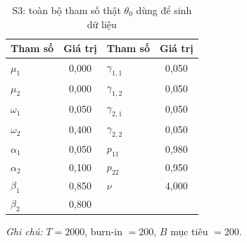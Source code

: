 \documentclass[11pt,a4paper]{article}
\begin{document}
\begin{table}[H]\centering\small
\caption{S3: toàn bộ tham số thật $\theta_0$ dùng để sinh dữ liệu}
\begin{tabularx}{\textwidth}{l C  l C}
\toprule
\textbf{Tham số} & \textbf{Giá trị} & \textbf{Tham số} & \textbf{Giá trị} \\
\midrule
$\mu_1$ & 0{,}000 & $\gamma_{1,1}$ & 0{,}050 \\
$\mu_2$ & 0{,}000 & $\gamma_{1,2}$ & 0{,}050 \\
$\omega_1$ & 0{,}050 & $\gamma_{2,1}$ & 0{,}050 \\
$\omega_2$ & 0{,}400 & $\gamma_{2,2}$ & 0{,}050 \\
$\alpha_1$ & 0{,}050 & $p_{11}$ & 0{,}980 \\
$\alpha_2$ & 0{,}100 & $p_{22}$ & 0{,}950 \\
$\beta_1$ & 0{,}850 & $\nu$ & 4{,}000 \\
$\beta_2$ & 0{,}800 & & \\
\bottomrule
\end{tabularx}
\vspace{0.2em}\raggedright\scriptsize \emph{Ghi chú:} $T=2000$, burn-in $=200$, $B$ mục tiêu $=200$.
\end{table}
\end{document}
